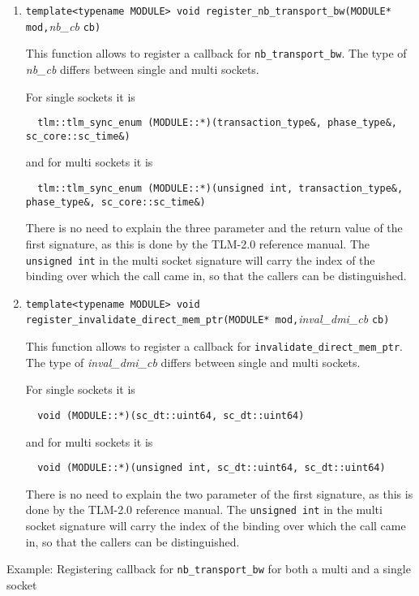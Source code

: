 \documentclass[a4paper,10pt]{article}          %
\begin{document}
\begin{enumerate}
\item 
\verb|template<typename MODULE> void register_nb_transport_bw(MODULE* mod,|\emph{nb\_cb} \verb|cb)|

This function allows to register a callback for \verb|nb_transport_bw|. The type of \emph{nb\_cb} differs between single and multi sockets.

For single sockets it is 

\verb|  tlm::tlm_sync_enum (MODULE::*)(transaction_type&, phase_type&, sc_core::sc_time&)|

and for multi sockets it is

\verb|  tlm::tlm_sync_enum (MODULE::*)(unsigned int, transaction_type&, phase_type&, sc_core::sc_time&)|

There is no need to explain the three parameter and the return value of the first signature, as this is done by the TLM-2.0 reference manual. The \verb|unsigned int| in the multi socket signature will carry the index of the binding over which the call came in, so that the callers can be distinguished.

\item 
\verb|template<typename MODULE> void register_invalidate_direct_mem_ptr(MODULE* mod,|\emph {inval\_dmi\_cb} \verb|cb)|

This function allows to register a callback for \verb|invalidate_direct_mem_ptr|. The type of \emph{inval\_dmi\_cb} differs between single and multi sockets.

For single sockets it is 

\verb|  void (MODULE::*)(sc_dt::uint64, sc_dt::uint64)|

and for multi sockets it is

\verb|  void (MODULE::*)(unsigned int, sc_dt::uint64, sc_dt::uint64)|

There is no need to explain the two parameter of the first signature, as this is done by the TLM-2.0 reference manual. The \verb|unsigned int| in the multi socket signature will carry the index of the binding over which the call came in, so that the callers can be distinguished.

\end{enumerate}

Example: Registering callback for \verb|nb_transport_bw| for both a multi and a single socket
\end{document}
